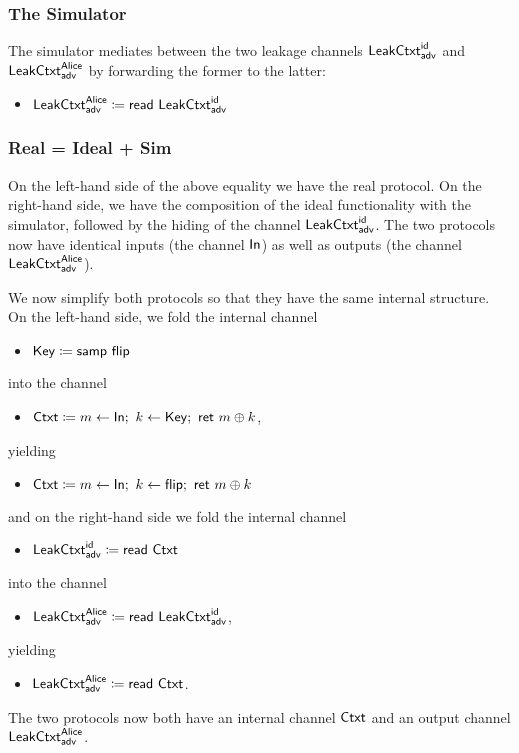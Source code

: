 \subsubsection{The Simulator}
The simulator mediates between the two leakage channels $\mathsf{LeakCtxt}^{\mathsf{id}}_{\mathsf{adv}}$ and $\mathsf{LeakCtxt}^{\mathsf{Alice}}_{\mathsf{adv}}$ by forwarding the former to the latter:
\begin{itemize}
\item $\mathsf{LeakCtxt}^{\mathsf{Alice}}_{\mathsf{adv}} \coloneqq \mathsf{read} \ \mathsf{LeakCtxt}^{\mathsf{id}}_{\mathsf{adv}}$
\end{itemize}

\subsubsection{Real = Ideal + Sim}
On the left-hand side of the above equality we have the real protocol. On the right-hand side, we have the composition of the ideal functionality with the simulator, followed by the hiding of the channel $\mathsf{LeakCtxt}^{\mathsf{id}}_{\mathsf{adv}}$. The two protocols now have identical inputs (the channel $\mathsf{In}$) as well as outputs (the channel $\mathsf{LeakCtxt}^{\mathsf{Alice}}_{\mathsf{adv}}$).

We now simplify both protocols so that they have the same internal structure. On the left-hand side, we fold the internal channel
\begin{itemize}
\item $\mathsf{Key} \coloneqq \mathsf{samp} \ \mathsf{flip}$
\end{itemize}
into the channel
\begin{itemize}
\item $\mathsf{Ctxt} \coloneqq m \leftarrow \mathsf{In}; \ k \leftarrow \mathsf{Key}; \ \mathsf{ret} \ m \oplus k$,
\end{itemize}
yielding
\begin{itemize}
\item $\mathsf{Ctxt} \coloneqq m \leftarrow \mathsf{In}; \ k \leftarrow \mathsf{flip}; \ \mathsf{ret} \ m \oplus k$
\end{itemize}
and on the right-hand side we fold the internal channel
\begin{itemize}
\item $\mathsf{LeakCtxt}^{\mathsf{id}}_{\mathsf{adv}} \coloneqq \mathsf{read} \ \mathsf{Ctxt}$
\end{itemize}
into the channel
\begin{itemize}
\item $\mathsf{LeakCtxt}^{\mathsf{Alice}}_{\mathsf{adv}} \coloneqq \mathsf{read} \ \mathsf{LeakCtxt}^{\mathsf{id}}_{\mathsf{adv}}$,
\end{itemize}
yielding
\begin{itemize}
\item $\mathsf{LeakCtxt}^{\mathsf{Alice}}_{\mathsf{adv}} \coloneqq \mathsf{read} \ \mathsf{Ctxt}$.
\end{itemize}
The two protocols now both have an internal channel $\mathsf{Ctxt}$ and an output channel $\mathsf{LeakCtxt}^{\mathsf{Alice}}_{\mathsf{adv}}$.

